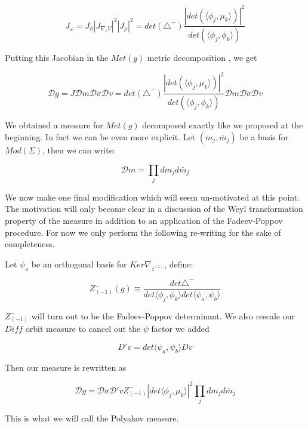     \begin{equation}
        J_\omega = J_\phi |J_{\nabla_z V}|^2 |J_\rho|^2 = det(\triangle^-) \frac { | det(\langle \phi_j , \mu_k \rangle) | ^2} {det(\langle \phi_j, \phi_k \rangle)}
    \end{equation}

    Putting this Jacobian in the $Met(g)$ metric decomposition \label{eq:measure-decomp}, we get

    \begin{equation}
        \mathcal D g = J \mathcal D m \mathcal D \sigma \mathcal D v =  det(\triangle^-) \frac { | det(\langle \phi_j , \mu_k \rangle) | ^2} {det(\langle \phi_j, \phi_k \rangle)} \mathcal D m \mathcal D \sigma \mathcal D v
    \end{equation}

    We obtained a measure for $Met(g)$ decomposed exactly like we proposed at the beginning. In fact we can be even more explicit. Let $(m_j, \bar m_j)$ be a basis for $Mod(\Sigma)$, then we can write:

    \begin{equation}
        \mathcal Dm = \prod_j dm_j d\bar m_j
    \end{equation}

    We now make one final modification which will seem un-motivated at this point. The motivation will only become clear in a discussion of the Weyl transformation property of the measure in addition to an application of the Fadeev-Poppov procedure. For now we only perform the following re-writing for the sake of completeness.

    Let $\psi_a$ be an orthogonal basis for $Ker \nabla_{\bar z^(1)}$, define:

    \begin{equation}
        Z^-_{(-1)} (g) \equiv  \frac{det\triangle^-}{det\langle \phi_j, \phi_k\rangle det\langle \psi_a, \psi_b \rangle}
    \end{equation}

    $Z^-_{(-1)}$ will turn out to be the Fadeev-Poppov determinant. We also rescale our $Diff$ orbit measure to cancel out the $\psi$ factor we added

    \begin{equation}
        D'v = det\langle \psi_a, \psi_b \rangle Dv
    \end{equation}

    Then our measure is rewritten as

    \begin{equation}
        \mathcal D g = \mathcal D \sigma \mathcal D' v Z^-_{(-1)}  | det\langle \phi_j , \mu_k \rangle | ^2 \prod_j dm_j d\bar m_j
    \end{equation}

    This is what we will call the Polyakov measure.